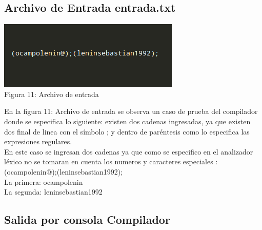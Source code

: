 \documentclass[a4paper,openright,12pt]{article}
\begin{document}
\subsection{Archivo de Entrada entrada.txt}

\begin{center}
\includegraphics[height=0.15\textheight]{entrada.png}
\\
Figura 11: Archivo de entrada
\end{center}

En la figura 11: Archivo de entrada se observa un caso de prueba del compilador donde se especifica lo siguiente: existen dos cadenas ingresadas, ya que existen dos final de linea con el símbolo ; y dentro de paréntesis como lo especifica las expresiones regulares.\\
En este caso se  ingresan dos cadenas ya que como se especifico en el analizador léxico no se tomaran en cuenta los numeros y caracteres especiales : \\
  (ocampolenin@);(leninsebastian1992);\\
La primera:  ocampolenin\\
La segunda:  leninsebastian1992\\


\subsection{Salida por consola Compilador}
\end{document}

